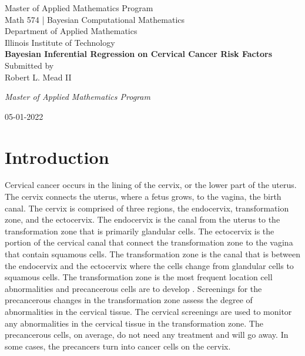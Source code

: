 \documentclass[12pt]{article}
\numberwithin{equation}{section}
\renewcommand{\baselinestretch}{1.25}
\begin{document}
\begin{center}
{Master of Applied Mathematics Program}\\
{Math 574 | Bayesian Computational Mathematics}\\
{Department of Applied Mathematics}\\
{Illinois Institute of Technology}\\
\vspace{4.5 cm}
{\Large \bf Bayesian Inferential Regression on Cervical Cancer Risk Factors }\\
\vspace{3.5 cm} 
{\Large Submitted by}\\
\vspace{0.5 cm}
{\Large Robert L. Mead II}\\
\vspace{7cm} 
\centerline{\emph{}} 
\centerline{\emph{Master of Applied 
Mathematics Program}}

\vspace{.1in}
\centerline{05-01-2022}
\end{center}
\thispagestyle{empty}
\newpage
\section{Introduction}
Cervical cancer occurs in the lining of the cervix, or the lower part of the uterus. The cervix connects the uterus, where a fetus grows, to the vagina, the birth canal. The cervix is comprised of three regions, the endocervix, transformation zone, and the ectocervix. The endocervix is the canal from the uterus to the transformation zone that is primarily glandular cells. The ectocervix is the portion of the cervical canal that connect the transformation zone to the vagina that contain squamous cells. The transformation zone is the canal that is between the endocervix and the ectocervix where the cells change from glandular cells to squamous cells. The transformation zone is the most frequent location cell abnormalities and precancerous cells are to develop \cite{NCCC}. Screenings for the precancerous changes in the transformation zone assess the degree of abnormalities in the cervical tissue. The cervical screenings are used to monitor any abnormalities in the cervical tissue in the transformation zone. The precancerous cells, on average, do not need any treatment and will go away. In some cases, the precancers turn into cancer cells on the cervix. 
\end{document}
